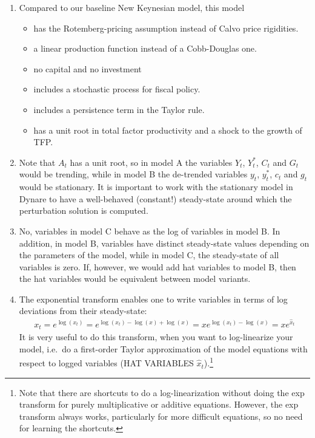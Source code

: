 \begin{enumerate}

\item Compared to our baseline New Keynesian model, this model
    \begin{itemize}
    \item has the Rotemberg-pricing assumption instead of Calvo price rigidities.
    \item a linear production function instead of a Cobb-Douglas one.
    \item no capital and no investment
    \item includes a stochastic process for fiscal policy.
    \item includes a persistence term in the Taylor rule.
    \item has a unit root in total factor productivity and a shock to the growth of {TFP}.
\end{itemize}
  
\item Note that \(A_t\) has a unit root, so in model A the variables \(Y_t\), \(Y_t^*\), \(C_t\) and \(G_t\) would be trending,
  while in model B the de-trended variables \(y_t\), \(y_t^*\), \(c_t\) and \(g_t\) would be stationary.
It is important to work with the stationary model in Dynare to have a well-behaved (constant!) steady-state
  around which the perturbation solution is computed.

\item No, variables in model C behave as the log of variables in model B.
In addition, in model B, variables have distinct steady-state values depending on the parameters of the model,
  while in model C, the steady-state of all variables is zero.
If, however, we would add hat variables to model B,
  then the hat variables would be equivalent between model variants.

\item The exponential transform enables one to write variables in terms of log deviations from their steady-state:
\begin{align*}
x_t = e^{\log(x_t)} = e^{\log(x_t) - \log(x) + \log(x)} = x e^{\log(x_t)-\log(x)} = x e^{\hat{x}_t}
\end{align*}
It is very useful to do this transform, when you want to log-linearize your model,
  i.e.\ do a first-order Taylor approximation of the model equations with respect to logged variables (HAT VARIABLES \(\hat{x}_t\)).\footnote{%
Note that there are shortcuts to do a log-linearization without doing the exp transform for purely multiplicative or additive equations.
However, the exp transform always works, particularly for more difficult equations, so no need for learning the shortcuts.
}
\begin{itemize}


\end{itemize}
\end{enumerate}
